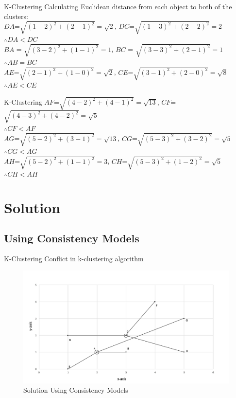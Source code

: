 \begin{frame}{K-Clustering}
  Calculating Euclidean distance from each object to both of the clusters:\\
  $DA$=$\sqrt{{(1-2)}^2+{(2-1)}^2}=\sqrt{2}$,
  $DC$=$\sqrt{{(1-3)}^2+{(2-2)}^2}=2$\\
  $\therefore DA<DC$\\
  $BA$ = $\sqrt{{(3-2)}^2+{(1-1)}^2}=1$,
  $BC$ = $\sqrt{{(3-3)}^2+{(2-1)}^2}=1$\\
  $\therefore AB=BC$\\
  $AE$=$\sqrt{{(2-1)}^2+{(1-0)}^2}=\sqrt{2}$,
  $CE$=$\sqrt{{(3-1)}^2+{(2-0)}^2}=\sqrt{8}$\\
  $\therefore AE<CE$\\
\end{frame}

\begin{frame}{K-Clustering}
  $AF$=$\sqrt{{(4-2)}^2+{(4-1)}^2}=\sqrt{13}$,
  $CF$=$\sqrt{{(4-3)}^2+{(4-2)}^2}=\sqrt{5}$\\
  $\therefore CF<AF$\\
  $AG$=$\sqrt{{(5-2)}^2+{(3-1)}^2}=\sqrt{13}$,
  $CG$=$\sqrt{{(5-3)}^2+{(3-2)}^2}=\sqrt{5}$\\
  $\therefore CG<AG$\\
  $AH$=$\sqrt{{(5-2)}^2+{(1-1)}^2}=3$,
  $CH$=$\sqrt{{(5-3)}^2+{(1-2)}^2}=\sqrt{5}$\\
  $\therefore CH<AH$\\
\end{frame}

\section{Solution}
\subsection{Using Consistency Models}
\begin{frame}{K-Clustering}
	Conflict in k-clustering algorithm
			\begin{figure}
			\includegraphics[width=0.8\linewidth]{figures/kcluster1.jpg}
			\caption{Solution Using Consistency Models}
			\end{figure}
\end{frame}

